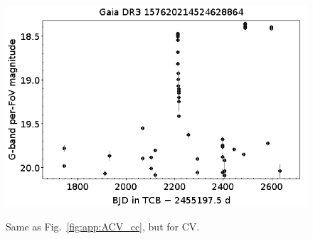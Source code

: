 \documentclass[longauth]{aa}
\begin{document}
\begin{appendix}
\begin{figure}
\hspace{2mm}
 \includegraphics[width=0.45\hsize]{figures/appendix/CV-96.png} \\
\vspace{4mm}
 \caption{Same as Fig.~\ref{fig:app:ACV_cc}, but for CV.}
 \label{fig:app:CV_cc}
\end{figure}




\end{appendix}
\end{document}
